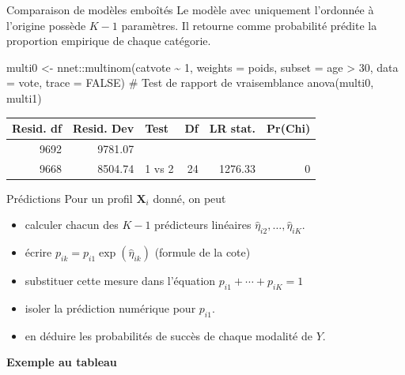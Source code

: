\documentclass[
  ignorenonframetext,
]{beamer}
\newenvironment{Shaded}{\begin{snugshade}}{\end{snugshade}}
\newcommand{\AttributeTok}[1]{\textcolor[rgb]{0.40,0.45,0.13}{#1}}
\newcommand{\CommentTok}[1]{\textcolor[rgb]{0.37,0.37,0.37}{#1}}
\newcommand{\ConstantTok}[1]{\textcolor[rgb]{0.56,0.35,0.01}{#1}}
\newcommand{\DecValTok}[1]{\textcolor[rgb]{0.68,0.00,0.00}{#1}}
\newcommand{\FunctionTok}[1]{\textcolor[rgb]{0.28,0.35,0.67}{#1}}
\newcommand{\NormalTok}[1]{\textcolor[rgb]{0.00,0.23,0.31}{#1}}
\newcommand{\OtherTok}[1]{\textcolor[rgb]{0.00,0.23,0.31}{#1}}
\newcommand{\SpecialCharTok}[1]{\textcolor[rgb]{0.37,0.37,0.37}{#1}}
\providecommand{\tightlist}{%
  \setlength{\itemsep}{0pt}\setlength{\parskip}{0pt}}\usepackage{longtable,booktabs,array}
\begin{document}
\begin{frame}[fragile]{Comparaison de modèles emboîtés}
\protect\hypertarget{comparaison-de-moduxe8les-embouxeetuxe9s}{}
Le modèle avec uniquement l'ordonnée à l'origine possède \(K-1\)
paramètres. Il retourne comme probabilité prédite la proportion
empirique de chaque catégorie.

\begin{Shaded}
\begin{Highlighting}[numbers=left,,]
\NormalTok{multi0 }\OtherTok{\textless{}{-}}\NormalTok{ nnet}\SpecialCharTok{::}\FunctionTok{multinom}\NormalTok{(catvote }\SpecialCharTok{\textasciitilde{}} \DecValTok{1}\NormalTok{,}
                         \AttributeTok{weights =}\NormalTok{ poids,}
             \AttributeTok{subset =}\NormalTok{ age }\SpecialCharTok{\textgreater{}} \DecValTok{30}\NormalTok{,}
                         \AttributeTok{data =}\NormalTok{ vote,}
                         \AttributeTok{trace =} \ConstantTok{FALSE}\NormalTok{)}
\CommentTok{\# Test de rapport de vraisemblance}
\FunctionTok{anova}\NormalTok{(multi0, multi1)}
\end{Highlighting}
\end{Shaded}

\begin{tabular}{r|r|l|r|r|r}
\hline
Resid. df & Resid. Dev & Test &    Df & LR stat. & Pr(Chi)\\
\hline
9692 & 9781.07 &  &  &  & \\
\hline
9668 & 8504.74 & 1 vs 2 & 24 & 1276.33 & 0\\
\hline
\end{tabular}
\end{frame}

\begin{frame}{Prédictions}
\protect\hypertarget{pruxe9dictions}{}
Pour un profil \(\mathbf{X}_i\) donné, on peut

\begin{itemize}
\tightlist
\item
  calculer chacun des \(K-1\) prédicteurs linéaires
  \(\widehat{\eta}_{i2}, \ldots, \widehat{\eta}_{iK}\).
\item
  écrire \(p_{ik} = p_{i1}\exp(\widehat{\eta}_{ik})\) (formule de la
  cote)
\item
  substituer cette mesure dans l'équation \(p_{i1} + \cdots + p_{iK}=1\)
\item
  isoler la prédiction numérique pour \(p_{i1}\).
\item
  en déduire les probabilités de succès de chaque modalité de \(Y\).
\end{itemize}

\textbf{Exemple au tableau}
\end{frame}
\end{document}

